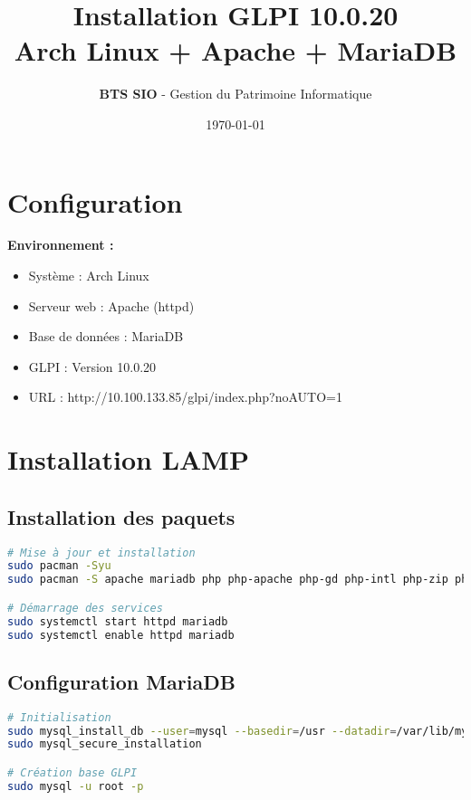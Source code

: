 \documentclass[12pt,a4paper]{article}
\title{
    \Large{\textbf{Installation GLPI 10.0.20}} \\
    \large{Arch Linux + Apache + MariaDB}
}
\author{\textbf{BTS SIO} - Gestion du Patrimoine Informatique}
\date{\today}
\begin{document}
\maketitle
\thispagestyle{empty}

\section{Configuration}

\textbf{Environnement :}
\begin{itemize}
    \item Système : Arch Linux
    \item Serveur web : Apache (httpd)
    \item Base de données : MariaDB
    \item GLPI : Version 10.0.20
    \item URL : http://10.100.133.85/glpi/index.php?noAUTO=1
\end{itemize}

\section{Installation LAMP}

\subsection{Installation des paquets}
\begin{lstlisting}[language=bash]
# Mise à jour et installation
sudo pacman -Syu
sudo pacman -S apache mariadb php php-apache php-gd php-intl php-zip php-curl php-mbstring php-xml php-mysql

# Démarrage des services
sudo systemctl start httpd mariadb
sudo systemctl enable httpd mariadb
\end{lstlisting}

\subsection{Configuration MariaDB}
\begin{lstlisting}[language=bash]
# Initialisation
sudo mysql_install_db --user=mysql --basedir=/usr --datadir=/var/lib/mysql
sudo mysql_secure_installation

# Création base GLPI
sudo mysql -u root -p
\end{lstlisting}
\end{document}
